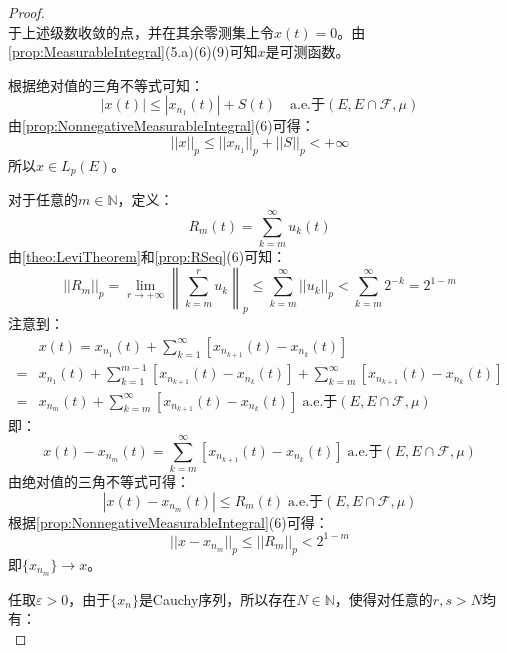 \begin{proof}
\begin{equation*}
	\end{equation*}
	于上述级数收敛的点，并在其余零测集上令$x(t)=0$。由\cref{prop:MeasurableIntegral}(5.a)(6)(9)可知$x$是可测函数。\par
	根据绝对值的三角不等式可知：
	\begin{equation*}
		|x(t)|\leqslant|x_{n_1}(t)|+S(t)\quad\text{a.e.于$(E,E\cap\mathscr{F},\mu)$}
	\end{equation*}
	由\cref{prop:NonnegativeMeasurableIntegral}(6)可得：
	\begin{equation*}
		||x||_p\leqslant||x_{n_1}||_p+||S||_p<+\infty
	\end{equation*}
	所以$x\in L_p(E)$。\par
	对于任意的$m\in\mathbb{N}$，定义：
	\begin{equation*}
		R_m(t)=\sum_{k=m}^{\infty}u_k(t)
	\end{equation*}
	由\cref{theo:LeviTheorem}和\cref{prop:RSeq}(6)可知：
	\begin{equation*}
		||R_m||_p=\lim_{r\to+\infty}\left\|\sum_{k=m}^{r}u_k\right\|_p\leqslant\sum_{k=m}^{\infty}||u_k||_p<\sum_{k=m}^{\infty}2^{-k}=2^{1-m}
	\end{equation*}
	注意到：
	\begin{align*}
		&x(t)=x_{n_1}(t)+\sum_{k=1}^{\infty}\left[x_{n_{k+1}}(t)-x_{n_k}(t)\right] \\
		=&x_{n_1}(t)+\sum_{k=1}^{m-1}\left[x_{n_{k+1}}(t)-x_{n_k}(t)\right]+\sum_{k=m}^{\infty}\left[x_{n_{k+1}}(t)-x_{n_k}(t)\right] \\
		=&x_{n_m}(t)+\sum_{k=m}^{\infty}\left[x_{n_{k+1}}(t)-x_{n_k}(t)\right]\;\text{a.e.于$(E,E\cap\mathscr{F},\mu)$}
	\end{align*}
	即：
	\begin{equation*}
		x(t)-x_{n_m}(t)=\sum_{k=m}^{\infty}\left[x_{n_{k+1}}(t)-x_{n_k}(t)\right]\;\text{a.e.于$(E,E\cap\mathscr{F},\mu)$}
	\end{equation*}
	由绝对值的三角不等式可得：
	\begin{equation*}
		|x(t)-x_{n_m}(t)|\leqslant R_m(t)\;\text{a.e.于$(E,E\cap\mathscr{F},\mu)$}
	\end{equation*}
	根据\cref{prop:NonnegativeMeasurableIntegral}(6)可得：
	\begin{equation*}
		||x-x_{n_m}||_p\leqslant||R_m||_p<2^{1-m}
	\end{equation*}
	即$\{x_{n_m}\}\to x$。\par
	任取$\varepsilon>0$，由于$\{x_n\}$是Cauchy序列，所以存在$N\in\mathbb{N}$，使得对任意的$r,s>N$均有：
	\begin{equation*}

\end{equation*}
\end{proof}
